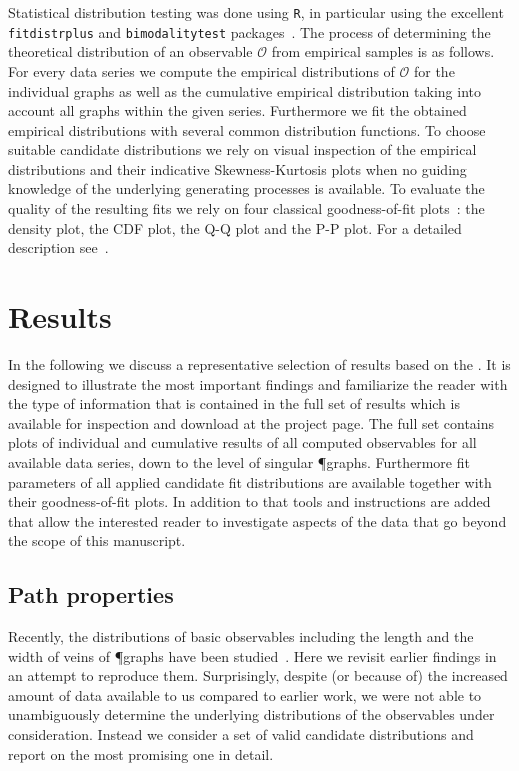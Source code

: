 		Statistical distribution testing was done using \verb+R+, in particular using the excellent \verb+fitdistrplus+ and \verb+bimodalitytest+ packages~\cite{delignette2015fitdistrplus}. The process of determining the theoretical distribution of an observable $\mathcal{O}$ from empirical samples is as follows. For every data series we compute the empirical distributions of $\mathcal{O}$ for the individual graphs as well as the cumulative empirical distribution taking into account all graphs within the given series. Furthermore we fit the obtained empirical distributions with several common distribution functions. To choose suitable candidate distributions we rely on visual inspection of the empirical distributions and their indicative Skewness-Kurtosis plots when no guiding knowledge of the underlying generating processes is available. To evaluate the quality of the resulting fits we rely on four classical goodness-of-fit plots~\cite{cullen1999probabilistic}: the density plot, the CDF plot, the Q-Q plot and the P-P plot. For a detailed description see~\cite{delignette2015fitdistrplus}.
		
\section{Results}

	In the following we discuss a representative selection of results based on the \data. It is designed to illustrate the most important findings and familiarize the reader with the type of information that is contained in the full set of results which is available for inspection and download at the \SMGR project page. The full set contains plots of individual and cumulative results of all computed observables for all available data series, down to the level of singular \P graphs. Furthermore fit parameters of all applied candidate fit distributions are available together with their goodness-of-fit plots. In addition to that tools and instructions are added that allow the interested reader to investigate aspects of the data that go beyond the scope of this manuscript.

	\subsection{Path properties}

		Recently, the distributions of basic observables including the length and the width of veins of \P graphs have been studied~\cite{baumgarten2010plasmodial}. Here we revisit earlier findings in an attempt to reproduce them. Surprisingly, despite (or because of) the increased amount of data available to us compared to earlier work, we were not able to unambiguously determine the underlying distributions of the observables under consideration. Instead we consider a set of valid candidate distributions and report on the most promising one in detail. 

